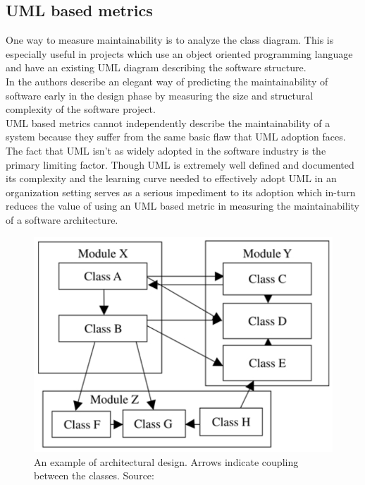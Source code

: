 \documentclass[15pt]{article}
\begin{document}
\subsection{UML based metrics}
One way to measure maintainability is to analyze the class diagram. This is especially useful in projects which use an object oriented programming language and have an existing UML diagram describing the software structure. \\


In \cite{genero_building_2007} the authors describe an elegant way of predicting the maintainability of software early in the design phase by measuring the size and structural complexity of the software project. \\

UML based metrics cannot independently describe the maintainability of a system because they suffer from the same basic flaw that UML adoption faces. The fact that UML isn't as widely adopted in the software industry is the primary limiting factor. Though UML is extremely well defined and documented its complexity and the learning curve needed to effectively adopt UML in an organization setting serves as a serious impediment to its adoption which in-turn reduces the value of using an UML based metric in measuring the maintainability of a software architecture.


\begin{figure}
	\includegraphics[width=0.9\linewidth]{./coupling}
	\caption{An example of architectural design.
	Arrows indicate coupling between the classes. Source:\cite{lindvall_empirically-based_2003}}
	\label{fig:coupling}
\end{figure}
\end{document}

